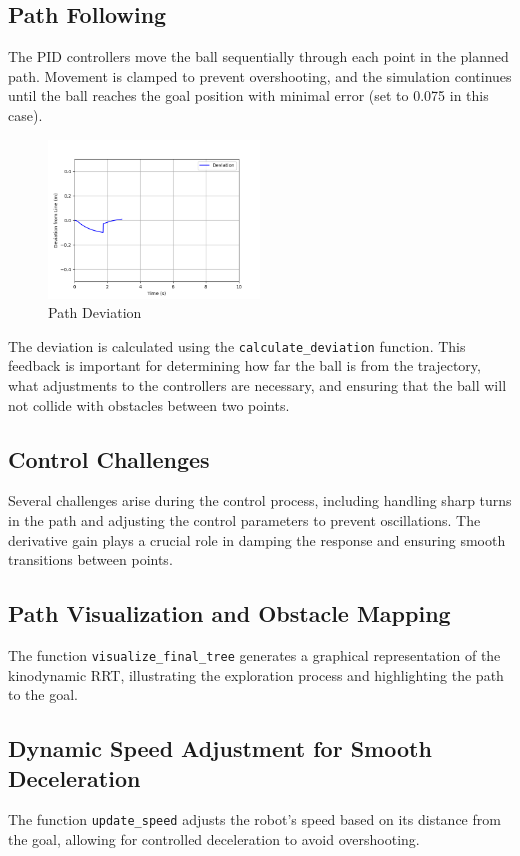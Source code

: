 \documentclass[12pt]{article}
\begin{document}
\subsection{Path Following}
The PID controllers move the ball sequentially through each point in the planned path. Movement is clamped to prevent overshooting, and the simulation continues until the ball reaches the goal position with minimal error (set to 0.075 in this case). 

\begin{figure}[h!]
    \centering
    \includegraphics[width=0.5\textwidth]{./images/deviation.png}
    \caption{Path Deviation}
    \label{fig:path_deviation}
\end{figure}
 
The deviation is calculated using the \texttt{calculate\_deviation} function. This feedback is important for determining how far the ball is from the trajectory, what adjustments to the controllers are necessary, and ensuring that the ball will not collide with obstacles between two points.

\subsection{Control Challenges}
Several challenges arise during the control process, including handling sharp turns in the path and adjusting the control parameters to prevent oscillations. The derivative gain plays a crucial role in damping the response and ensuring smooth transitions between points.

\subsection{Path Visualization and Obstacle Mapping}
The function \texttt{visualize\_final\_tree} generates a graphical representation of the kinodynamic RRT, illustrating the exploration process and highlighting the path to the goal.


\subsection{Dynamic Speed Adjustment for Smooth Deceleration}
The function \texttt{update\_speed} adjusts the robot's speed based on its distance from the goal, allowing for controlled deceleration to avoid overshooting.
\end{document}
